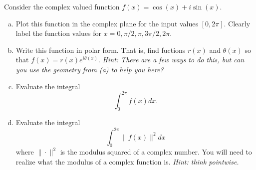 \documentclass[12pt]{article} %
\begin{document}
\begin{problem}
	Consider the complex valued function $f(x) = \cos(x)+i\sin(x)$.  
	\begin{enumerate}[(a)]
		\item Plot this function in the complex plane for the input values $[0,2\pi]$. Clearly label the function values for $x=0,\pi/2,\pi,3\pi/2,2\pi$.
		\item Write this function in polar form. That is, find fuctions $r(x)$ and $\theta(x)$ so that $f(x)=r(x)e^{i\theta(x)}$. \emph{Hint: There are a few ways to do this, but can you use the geometry from (a) to help you here?}
		\item Evaluate the integral
		\[
			\int_0^{2\pi}f(x)dx.
		\]
		\item Evaluate the integral
		\[
			\int_0^{2\pi} \|f(x)\|^2dx
		\]
		where $\|\cdot\|^2$ is the modulus squared of a complex number. You will need to realize what the modulus of a complex function is. \emph{Hint: think pointwise.}
	\end{enumerate}
\end{problem}
\end{document}
